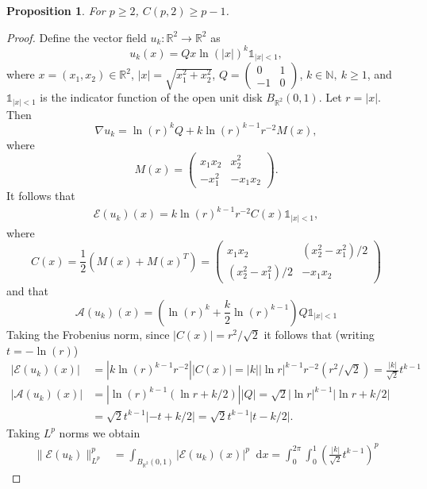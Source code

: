 \documentclass[11pt, a4paper]{amsart}
\newtheorem{proposition}{Proposition}[section]
\theoremstyle{definition}
\theoremstyle{remark}
\newcommand{\R}{\mathbb{R}}
\newcommand*\diff{\mathop{}\!\mathrm{d}}
\newcommand{\mat}[1]{
    \begin{pmatrix} #1 \end{pmatrix}
}
\newcommand{\abs}[1]{|#1|}
\newcommand{\norm}[1]{\|#1\|}
\begin{document}
\begin{proposition}\label{prop:lowerbound2}
For $p\ge 2$, $C(p,2)\ge p-1$.
\end{proposition}
\begin{proof}
Define the vector field $u_k\colon \R^2 \to \R^2$ as 
\begin{equation*}
u_k(x) = Q x \ln(\abs{x})^k \mathds{1}_{\abs{x}<1},
\end{equation*}
where $x=(x_1, x_2) \in \R^2$,
$\abs{x} = \sqrt{x_1^2 + x_2^2}$,
$Q = \mat{0 & 1 \\ -1 & 0}$, $k\in \mathbb N,\ k\ge 1$,
and $\mathds{1}_{\abs{x}<1}$
is the indicator function of the open unit disk
$B_{\R^2}(0,1)$.
Let $r = \abs{x}$. Then
\begin{equation*}
\nabla u_k = \ln(r)^k Q + k \ln(r)^{k-1} r^{-2} M(x),
\end{equation*} where 
\begin{equation*}
M(x) = \mat{x_1x_2 & x_2^2 \\ -x_1^2 & -x_1x_2}.
\end{equation*}
It follows that
\begin{align*}
\mathcal E(u_k)(x)
= k \ln(r)^{k-1} r^{-2} C(x) \mathds{1}_{\abs{x}<1},
\end{align*}
where 
\begin{equation*}
C(x) = \frac{1}{2}(M(x)+M(x)^T)
= \mat{x_1x_2 & (x_2^2-x_1^2)/2
\\ (x_2^2-x_1^2)/2 & -x_1x_2}
\end{equation*}
and that
\begin{equation*}
\mathcal A(u_k)(x) =
\left(\ln(r)^k + \frac{k}{2} \ln(r)^{k-1}\right)
Q \mathds{1}_{\abs{x}<1}
\end{equation*}
Taking the Frobenius norm, since
$|C(x)| = r^2 / \sqrt{2}$ 
it follows that (writing $t=-\ln(r)$)
\begin{align*}
|\mathcal E(u_k)(x)|
&= \abs{k \ln(r)^{k-1} r^{-2}} |C(x)|
= \abs{k} \abs{\ln r}^{k-1} r^{-2} (r^2 / \sqrt{2})
= \frac{\abs{k}}{\sqrt{2}} t^{k-1}\\
|\mathcal A(u_k)(x)|
&= \abs{\ln(r)^{k-1}(\ln r + k/2)} |Q|
= \sqrt{2} \abs{\ln r}^{k-1} \abs{\ln r + k/2}\\
&= \sqrt{2} t^{k-1} \abs{-t + k/2}
= \sqrt{2} t^{k-1} \abs{t - k/2}.
\end{align*}
Taking $L^p$ norms we obtain
\begin{align*}
\norm{\mathcal E(u_k)}_{L^p}^p& = \int_{B_{\R^2}(0,1)}
|\mathcal E(u_k)(x)|^p \diff x
= \int_0^{2\pi} \int_0^1
\left(\frac{\abs{k}}{\sqrt{2}} t^{k-1}\right)^p

\end{align*}
\end{proof}
\end{document}
